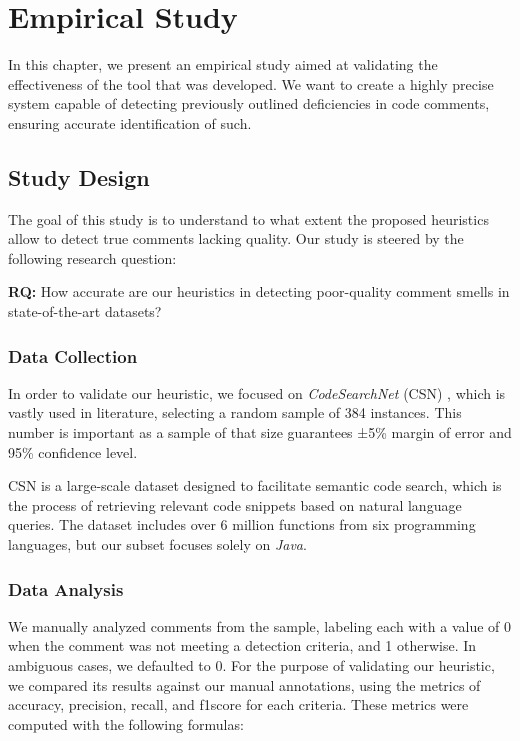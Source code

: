 
\chapter{Empirical Study} %

\label{Chapter4}


In this chapter, we present an empirical study aimed at validating the effectiveness of the tool that was developed. We want to create a highly precise system capable of detecting previously outlined deficiencies in code comments, ensuring accurate identification of such.

\section{Study Design}
The goal of this study is to understand to what extent the proposed heuristics allow to detect true comments lacking quality. Our study is steered by the following research
question:
\begin{large}
	\begin{Center}
		\textbf{RQ:} How accurate are our heuristics in detecting poor-quality comment smells in state-of-the-art datasets?
	\end{Center}
\end{large}

\subsection{Data Collection}
In order to validate our heuristic, we focused on \textit{CodeSearchNet} (CSN) \cite{CSN}, which is vastly used in literature, selecting a random sample of 384 instances.
This number is important as a sample of that size guarantees ±5\% margin of error and 95\% confidence level.

\noindent CSN is a large-scale dataset designed to facilitate semantic code search, which is the process of retrieving relevant code snippets based on natural language queries.
The dataset includes over 6 million functions from six programming languages, but our subset focuses solely on \textit{Java}.

\subsection{Data Analysis}
We manually analyzed comments from the sample, labeling each with a value of 0 when the comment was not meeting a detection criteria, and 1 otherwise. In ambiguous cases, we defaulted to 0.
For the purpose of validating our heuristic, we compared its results against our manual annotations, using the metrics of accuracy, precision, recall, and f1score for each criteria. These metrics were computed with the following formulas:

